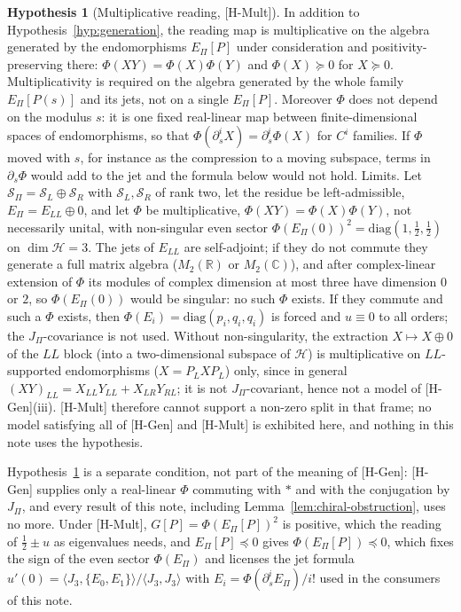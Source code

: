\documentclass[11pt]{article}
\theoremstyle{definition}
\newtheorem{hypothesis}{Hypothesis}
\newcommand{\EPi}{E_\Pi}
\begin{document}
    \begin{hypothesis}[Multiplicative reading, {[H-Mult]}]
      \label{hyp:mult}
      In addition to Hypothesis~\ref{hyp:generation}, the reading map is multiplicative on the algebra generated by
      the endomorphisms $\EPi[P]$ under consideration and positivity-preserving there: $\Phi(XY)=\Phi(X)\Phi(Y)$ and $\Phi(X)\succeq0$ for $X\succeq0$.
      Multiplicativity is required on the algebra generated by the whole family $\EPi[P(s)]$ and its jets, not on a
      single $\EPi[P]$.
      Moreover $\Phi$ does not depend on the modulus $s$: it is one fixed real-linear map between finite-dimensional
      spaces of endomorphisms, so that $\Phi(\partial_s^iX)=\partial_s^i\Phi(X)$ for $C^i$ families.
      If $\Phi$ moved with $s$, for instance as the compression to a moving subspace, terms in $\partial_s\Phi$ would
      add to the jet and the formula below would not hold.
      Limits. Let $\mathcal S_\Pi=\mathcal S_L\oplus\mathcal S_R$ with $\mathcal S_L,\mathcal S_R$ of rank two, let the residue be
      left-admissible, $\EPi=E_{LL}\oplus0$, and let $\Phi$ be multiplicative, $\Phi(XY)=\Phi(X)\Phi(Y)$, not necessarily
      unital, with non-singular even sector $\Phi(\EPi(0))^2=\mathrm{diag}(1,\tfrac12,\tfrac12)$ on $\dim\mathcal H=3$.
      The jets of $E_{LL}$ are self-adjoint; if they do not commute they generate a full matrix algebra ($M_2(\mathbb R)$ or
      $M_2(\mathbb C)$), and after complex-linear extension of $\Phi$ its modules of complex dimension at most three have
      dimension $0$ or $2$, so $\Phi(\EPi(0))$ would be singular: no such $\Phi$
      exists.
      If they commute and such a $\Phi$ exists, then $\Phi(E_i)=\mathrm{diag}(p_i,q_i,q_i)$ is forced and $u\equiv0$ to all
      orders; the $J_\Pi$-covariance is not used.
      Without non-singularity, the extraction $X\mapsto X\oplus0$ of the $LL$ block (into a two-dimensional subspace of
      $\mathcal H$) is multiplicative on $LL$-supported endomorphisms ($X=P_LXP_L$) only, since in general
      $(XY)_{LL}=X_{LL}Y_{LL}+X_{LR}Y_{RL}$; it is not $J_\Pi$-covariant, hence not a model of [H-Gen](iii).
      [H-Mult] therefore cannot support a non-zero split in that frame; no model satisfying all of [H-Gen] and [H-Mult] is
      exhibited here, and nothing in this note uses the hypothesis.
    \end{hypothesis}

    Hypothesis~\ref{hyp:mult} is a separate condition, not part of the meaning of [H-Gen]: [H-Gen] supplies only a
    real-linear $\Phi$ commuting with $*$ and with the conjugation by $J_\Pi$, and every result of this note, including
    Lemma~\ref{lem:chiral-obstruction}, uses no more.
    Under [H-Mult], $G[P]=\Phi(\EPi[P])^{2}$ is positive, which the reading of $\tfrac12\pm u$ as eigenvalues needs, and $\EPi[P]\preceq0$ gives $\Phi(\EPi[P])\preceq0$, which fixes the sign of
    the even sector $\Phi(\EPi)$ and licenses the jet formula $u'(0)=\langle J_3,\{E_0,E_1\}\rangle/\langle J_3,J_3\rangle$
    with $E_i=\Phi(\partial_s^i\EPi)/i!$ used in the consumers of this note.
\end{document}
